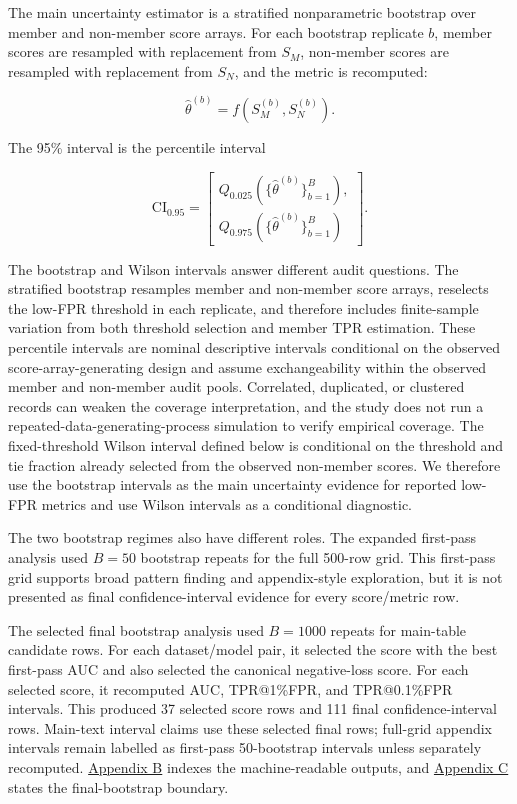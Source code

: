 \documentclass[
  10pt,
  twocolumn]{article}
\begin{document}
The main uncertainty estimator is a stratified nonparametric bootstrap over member and non-member score arrays. For each bootstrap replicate \(b\), member scores are resampled with replacement from \(S_M\), non-member scores are resampled with replacement from \(S_N\), and the metric is recomputed:

\[
\hat{\theta}^{(b)}
= f(S_M^{(b)}, S_N^{(b)}).
\]

The 95\% interval is the percentile interval \cite{ref-34}

\[
\mathrm{CI}_{0.95} =
\left[
\begin{gathered}
Q_{0.025}\left(\{\hat{\theta}^{(b)}\}_{b=1}^{B}\right),\\
Q_{0.975}\left(\{\hat{\theta}^{(b)}\}_{b=1}^{B}\right)
\end{gathered}
\right].
\]

The bootstrap and Wilson intervals answer different audit questions. The stratified bootstrap resamples member and non-member score arrays, reselects the low-FPR threshold in each replicate, and therefore includes finite-sample variation from both threshold selection and member TPR estimation. These percentile intervals are nominal descriptive intervals conditional on the observed score-array-generating design and assume exchangeability within the observed member and non-member audit pools. Correlated, duplicated, or clustered records can weaken the coverage interpretation, and the study does not run a repeated-data-generating-process simulation to verify empirical coverage. The fixed-threshold Wilson interval defined below is conditional on the threshold and tie fraction already selected from the observed non-member scores. We therefore use the bootstrap intervals as the main uncertainty evidence for reported low-FPR metrics and use Wilson intervals as a conditional diagnostic.

The two bootstrap regimes also have different roles. The expanded first-pass analysis used \(B=50\) bootstrap repeats for the full 500-row grid. This first-pass grid supports broad pattern finding and appendix-style exploration, but it is not presented as final confidence-interval evidence for every score/metric row.

The selected final bootstrap analysis used \(B=1000\) repeats for main-table candidate rows. For each dataset/model pair, it selected the score with the best first-pass AUC and also selected the canonical negative-loss score. For each selected score, it recomputed AUC, TPR@1\%FPR, and TPR@0.1\%FPR intervals. This produced 37 selected score rows and 111 final confidence-interval rows. Main-text interval claims use these selected final rows; full-grid appendix intervals remain labelled as first-pass 50-bootstrap intervals unless separately recomputed. \protect\hyperlink{appendix-b-supplementary-output-index}{Appendix B} indexes the machine-readable outputs, and \protect\hyperlink{appendix-c-final-bootstrap-boundary}{Appendix C} states the final-bootstrap boundary.
\end{document}
